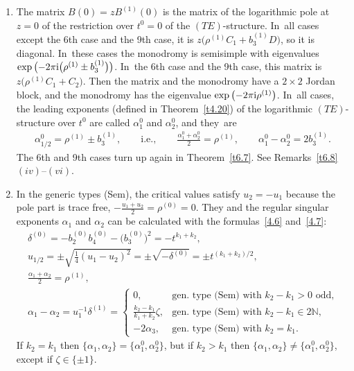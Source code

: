 \documentclass[pdftex]{sigma}%
\numberwithin{equation}{section}
\numberwithin{figure}{section}
\newcommand{\N}{{\mathbb N}}
\begin{document}
\begin{Remarks}\label{t6.4}\qquad
\begin{enumerate}\itemsep=0pt
\item[$(i)$] The matrix $B(0)=zB^{(1)}(0)$ is the matrix of the
logarithmic pole at $z=0$ of the restriction over $t^0=0$
of the $(TE)$-structure. In~all cases except the 6th case and the 9th case, it is
$z\big(\rho^{(1)}C_1+b_3^{(1)}D\big)$, so it is diagonal. In~these cases the monodromy is semisimple with eigenvalues
$\exp\big({-}2\pi {\rm i} \big(\rho^{(1)}\pm b_3^{(1)}\big)\big)$. In~the 6th case and the 9th case,
this matrix is $z\big(\rho^{(1)}C_1+C_2\big)$. Then the matrix and
the monodromy have a $2\times 2$ Jordan block,
and the monodromy has the eigenvalue $\exp\big({-}2\pi {\rm i}\rho^{(1)}\big)$. In~all cases, the leading exponents
(defined in Theorem~\ref{t4.20})
of the logarithmic $(TE)$-structure over $t^0$ are
called $\alpha_1^0$ and $\alpha_2^0$, and they~are
\begin{gather*}%
\alpha_{1/2}^0=\rho^{(1)}\pm b_3^{(1)},\qquad
\text{i.e.},\qquad \frac{\alpha_1^0+\alpha_2^0}{2}=\rho^{(1)},\qquad
\alpha_1^0-\alpha_2^0=2b_3^{(1)}.
\end{gather*}
The 6th and 9th cases turn up again in Theorem~\ref{t6.7}.
See Remarks~\ref{t6.8}$(iv)$--$(vi)$.

\item[$(ii)$] In the generic types (Sem), the critical values satisfy
$u_2=-u_1$ because the pole part is trace free,
$-\frac{u_1+u_2}{2}=\rho^{(0)}=0$.
They and the regular singular exponents $\alpha_1$ and
$\alpha_2$ can be calculated with the formulas~\eqref{4.6} and~\eqref{4.7}:
\begin{gather}\label{6.22}
\delta^{(0)}= -b_2^{(0)}b_4^{(0)}-\big(b_3^{(0)}\big)^2=-t^{k_1+k_2},
\\
u_{1/2}=\pm\sqrt{\frac{1}{4}(u_1-u_2)^2}=\pm\sqrt{-\delta^{(0)}}
=\pm t^{(k_1+k_2)/2},\label{6.23}
\\
\frac{\alpha_1+\alpha_2}{2}= \rho^{(1)}, \label{6.24}
\\
\alpha_1-\alpha_2= u_1^{-1}\delta^{(1)}
= \begin{cases}
0,& \text{gen. type (Sem) with }k_2-k_1>0\text{ odd,}\\
\frac{k_2-k_1}{k_1+k_2}\zeta,
& \text{gen. type (Sem) with }k_2-k_1\in 2\N,\\
-2\alpha_3,& \text{gen. type (Sem) with }k_2=k_1.
\end{cases} \label{6.25}
\end{gather}
If $k_2=k_1$ then $\{\alpha_1,\alpha_2\}
=\big\{\alpha_1^0,\alpha_2^0\big\}$, but if
$k_2>k_1$ then $\{\alpha_1,\alpha_2\}\neq
\big\{\alpha_1^0,\alpha_2^0\big\}$, except if $\zeta\in\{\pm 1\}$.


\end{enumerate}
\end{Remarks}
\end{document}
